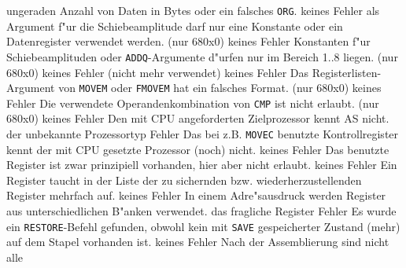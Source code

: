 \documentclass[12pt,a4paper,twoside]{report}
\newcommand{\tty}[1]{{\tt #1}}
\begin{document}
\begin{description}
{                ungeraden Anzahl von Daten in Bytes oder ein falsches \tty{ORG}.}
               {keines}
               {Fehler}
               {als Argument f"ur die Schiebeamplitude darf nur
                eine Konstante oder ein Datenregister verwendet werden.
                (nur 680x0)}
               {keines}
               {Fehler}
               {Konstanten f"ur Schiebeamplituden oder
                \tty{ADDQ}-Argumente d"urfen nur im Bereich 1..8 liegen. (nur
                680x0)}
               {keines}
               {Fehler}
               {(nicht mehr verwendet)}
               {keines}
               {Fehler}
               {Das Registerlisten-Argument von \tty{MOVEM}
	        oder \tty{FMOVEM} hat ein falsches Format. (nur 680x0)}
               {keines}
               {Fehler}
               {Die verwendete Operandenkombination von \tty{CMP}
	        ist nicht erlaubt. (nur 680x0)}
               {keines}
               {Fehler}
               {Den mit CPU angeforderten Zielprozessor kennt AS
                nicht.}
               {der unbekannte Prozessortyp}
               {Fehler}
               {Das bei z.B. \tty{MOVEC} benutzte
	        Kontrollregister  kennt der mit CPU gesetzte Prozessor
	        (noch) nicht.}
               {keines}
               {Fehler}
               {Das benutzte Register ist zwar prinzipiell
                vorhanden, hier aber nicht erlaubt.}
               {keines}
               {Fehler}
               {Ein Register taucht in der Liste der zu sichernden bzw.
                wiederherzustellenden Register mehrfach auf.}
               {keines}
               {Fehler}
               {In einem Adre"sausdruck werden Register aus unterschiedlichen
                B"anken verwendet.}
               {das fragliche Register}
               {Fehler}
               {Es wurde ein \tty{RESTORE}-Befehl gefunden, obwohl
                kein mit \tty{SAVE} gespeicherter Zustand (mehr) auf dem Stapel
                vorhanden ist.}
               {keines}
               {Fehler}
               {Nach der Assemblierung sind nicht alle
}
\end{description}
\end{document}
